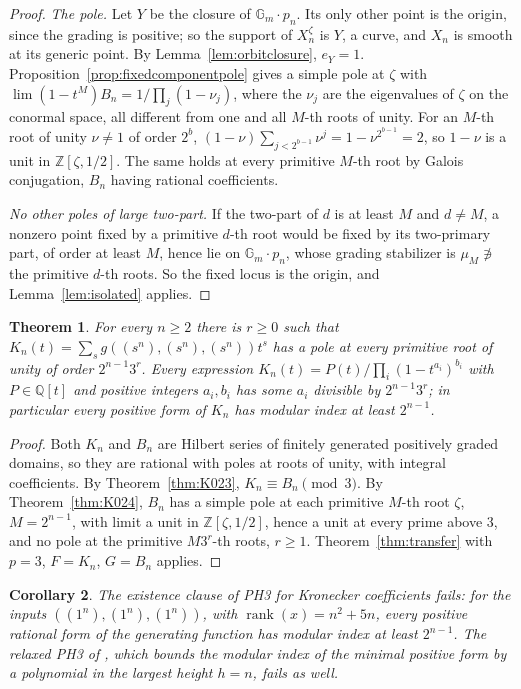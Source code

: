 \documentclass[11pt,a4paper]{article}
\newtheorem{theorem}{Theorem}[section]
\newtheorem{corollary}[theorem]{Corollary}
\theoremstyle{definition}
\newcommand{\Q}{\mathbb{Q}}
\newcommand{\Z}{\mathbb{Z}}
\newcommand{\Gm}{\mathbb{G}_m}
\newcommand{\rank}{\operatorname{rank}}
\begin{document}
\begin{proof}
\emph{The pole.} Let $Y$ be the closure of $\Gm\cdot p_n$. Its only other point
is the origin, since the grading is positive; so the support of
$X_n^{\zeta}$ is $Y$, a curve, and $X_n$ is smooth at its generic point. By
Lemma~\ref{lem:orbitclosure}, $e_Y=1$. Proposition~\ref{prop:fixedcomponentpole}
gives a simple pole at $\zeta$ with $\lim(1-t^M)B_n=1/\prod_j(1-\nu_j)$, where
the $\nu_j$ are the eigenvalues of $\zeta$ on the conormal space, all
different from one and all $M$-th roots of unity. For an $M$-th root of unity
$\nu\ne1$ of order $2^b$, $(1-\nu)\sum_{j<2^{b-1}}\nu^j=1-\nu^{2^{b-1}}=2$, so
$1-\nu$ is a unit in $\Z[\zeta,1/2]$. The same holds at every primitive
$M$-th root by Galois conjugation, $B_n$ having rational coefficients.

\emph{No other poles of large two-part.} If the two-part of $d$ is at least $M$
and $d\ne M$, a nonzero point fixed by a primitive $d$-th root would be fixed by
its two-primary part, of order at least $M$, hence lie on $\Gm\cdot p_n$, whose
grading stabilizer is $\mu_M\not\ni$ the primitive $d$-th roots. So the fixed
locus is the origin, and Lemma~\ref{lem:isolated} applies.
\end{proof}

\begin{theorem}\label{thm:kronecker}
For every $n\ge2$ there is $r\ge0$ such that $K_n(t)=\sum_sg((s^n),(s^n),
(s^n))t^s$ has a pole at every primitive root of unity of order $2^{n-1}3^r$.
Every expression $K_n(t)=P(t)/\prod_i(1-t^{a_i})^{b_i}$ with $P\in\Q[t]$ and
positive integers $a_i,b_i$ has some $a_i$ divisible by $2^{n-1}3^r$; in
particular every positive form of $K_n$ has modular index at least $2^{n-1}$.
\end{theorem}

\begin{proof}
Both $K_n$ and $B_n$ are Hilbert series of finitely generated positively graded
domains, so they are rational with poles at roots of unity, with integral
coefficients. By Theorem~\ref{thm:K023}, $K_n\equiv B_n\pmod 3$. By
Theorem~\ref{thm:K024}, $B_n$ has a simple pole at each primitive $M$-th root
$\zeta$, $M=2^{n-1}$, with limit a unit in $\Z[\zeta,1/2]$, hence a unit at
every prime above $3$, and no pole at the primitive $M3^r$-th roots, $r\ge1$.
Theorem~\ref{thm:transfer} with $p=3$, $F=K_n$, $G=B_n$ applies.
\end{proof}

\begin{corollary}\label{cor:kroneckerPH3}
The existence clause of PH3 for Kronecker coefficients \cite[Hypothesis
3.3.4]{GCT6} fails: for the inputs $((1^n),(1^n),(1^n))$, with
$\rank(x)=n^2+5n$, every positive rational form of the generating function has
modular index at least $2^{n-1}$. The relaxed PH3 of \cite[Appendix,
p.~20]{BOR}, which bounds the modular index of the minimal positive form by a
polynomial in the largest height $h=n$, fails as well.
\end{corollary}
\end{document}
